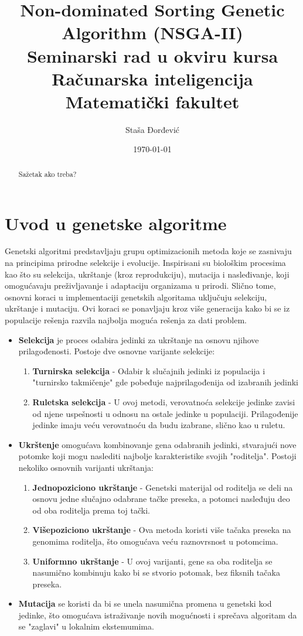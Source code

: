 \documentclass[12pt]{article}
\title{Non-dominated Sorting Genetic Algorithm (NSGA-II) \\
\normalsize Seminarski rad u okviru kursa\\ Računarska inteligencija
\\Matematički fakultet}
\author{Staša Đorđević}
\date{\today} %
\begin{document}
\maketitle

\begin{abstract}
Sažetak ako treba?
\end{abstract}

\section{Uvod u genetske algoritme}
Genetski algoritmi predstavljaju grupu optimizacionih metoda koje se zasnivaju na principima prirodne selekcije i evolucije. Inspirisani su biološkim procesima kao što su selekcija, ukrštanje (kroz reprodukciju), mutacija i nasleđivanje, koji omogućavaju preživljavanje i adaptaciju organizama u prirodi. Slično tome, osnovni koraci u implementaciji genetskih algoritama uključuju selekciju, ukrštanje i mutaciju. Ovi koraci se ponavljaju kroz više generacija kako bi se iz populacije rešenja razvila najbolja moguća rešenja za dati problem.

\begin{itemize}
    \item \textbf{Selekcija} je proces odabira jedinki za ukrštanje na osnovu njihove prilagođenosti. Postoje dve osnovne varijante selekcije:
    \begin{enumerate}
        \item \textbf{Turnirska selekcija} - Odabir k slučajnih jedinki iz populacija i "turnirsko takmičenje" gde pobeđuje najprilagođenija od izabranih jedinki
        \item \textbf{Ruletska selekcija} - U ovoj metodi, verovatnoća selekcije jedinke zavisi od njene uspešnosti u odnosu na ostale jedinke u populaciji. Prilagođenije jedinke imaju veću verovatnoću da budu izabrane, slično kao u ruletu.
    \end{enumerate}
    \item \textbf{Ukrštenje} omogućava kombinovanje gena odabranih jedinki, stvarajući nove potomke koji mogu naslediti najbolje karakteristike svojih "roditelja". Postoji nekoliko osnovnih varijanti ukrštanja:
    \begin{enumerate}
        \item \textbf{Jednopoziciono ukrštanje} - Genetski materijal od roditelja se deli na osnovu jedne slučajno odabrane tačke preseka, a potomci nasleđuju deo od oba roditelja prema toj tački.
        \item \textbf{Višepoziciono ukrštanje} - Ova metoda koristi više tačaka preseka na genomima roditelja, što omogućava veću raznovrsnost u potomcima.
        \item \textbf{Uniformno ukrštanje} - U ovoj varijanti, gene sa oba roditelja se nasumično kombinuju kako bi se stvorio potomak, bez fiksnih tačaka preseka.
    \end{enumerate}
    \item \textbf{Mutacija} se koristi da bi se unela nasumična promena u genetski kod jedinke, što omogućava istraživanje novih mogućnosti i sprečava algoritam da se "zaglavi" u lokalnim ekstemumima.
\end{itemize}
\end{document}
